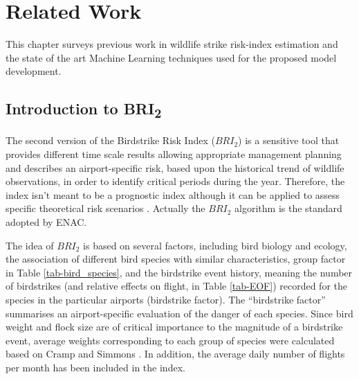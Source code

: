 
\chapter{Related Work}\label{ch:Ch.2}

This chapter surveys previous work in wildlife strike risk-index estimation and the state of the art Machine Learning techniques used for the proposed model development.

\section{Introduction to BRI\textsubscript{2}}
The second version of the Birdstrike Risk Index ($BRI_2$) is a sensitive tool that provides different time scale results allowing appropriate management planning and describes an airport-specific risk, based upon the historical trend of wildlife observations, in order to identify critical periods during the year.
Therefore, the index isn’t meant to be a prognostic index although it can be applied to assess specific theoretical risk scenarios \cite{soldatini2011wildlife}. 
Actually the $BRI_2$ algorithm is the standard adopted by ENAC.

The idea of $BRI_2$ is based on several factors, including bird biology and ecology, the association of different bird species with similar characteristics, group factor in Table \ref{tab-bird_species}, and the birdstrike event history, meaning the number of birdstrikes (and relative effects on flight, in Table \ref{tab-EOF}) recorded for the species in the particular airports (birdstrike factor). 
The “birdstrike factor” summarises an airport-specific evaluation of the danger of each species.
Since bird weight and flock size are of critical importance to the magnitude of a birdstrike event, average weights corresponding to each group of species were calculated based on Cramp and Simmons \cite{cramp1992handbook}.
In addition, the average daily number of flights per month has been included in the index.

